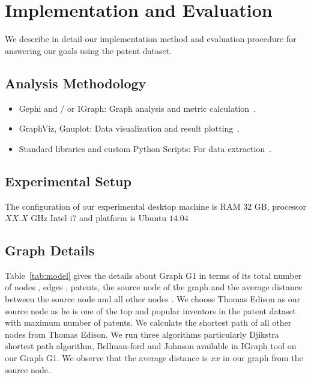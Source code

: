 \section{Implementation and Evaluation}
We describe in detail our implementation method and evaluation procedure for answering 
our goals using the patent dataset.

\subsection{Analysis Methodology}

\begin{itemize}
\squish
\item Gephi and / or IGraph: Graph analysis and metric calculation~\cite{gephi, igraph}.

\item GraphViz, Gnuplot: Data visualization and result plotting~\cite{graphviz, gnuplot}.

\item Standard libraries and custom Python Scripts: For data extraction~\cite{python}.
\end{itemize}

\subsection{Experimental Setup}
The configuration of our experimental desktop machine is RAM $32$ GB, processor $XX.X$ GHz Intel i7 
and platform is Ubuntu $14.04$

\subsection{Graph Details}
Table~\ref{tab:model} gives the details about Graph G1 in
terms of its total number of nodes , edges , patents, the source node  of the graph
and the average distance between the source node and all other nodes .  
 We choose Thomas Edison as our source node
as he is one of the top and popular inventors in the patent dataset with maximum number of patents.
We calculate the shortest path of all other nodes from Thomas Edison. 
We run three algorithms particularly Djikstra shortest path algorithm, Bellman-ford and Johnson 
available in IGraph tool on our Graph G1. We observe that the average distance is $xx$ in our graph
from the source node.

